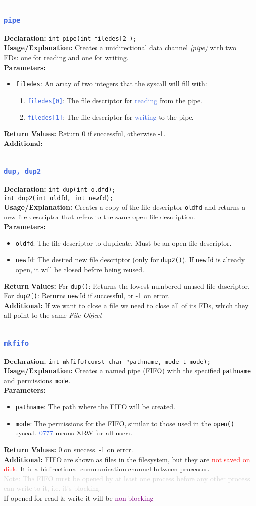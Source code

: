 \documentclass[openany,12pt]{book}
\newcommand{\code}[1]{\texttt{#1}}
\newcommand{\red}[1]{\textcolor{red}{#1}}
\newcommand{\blue}[1]{\textcolor{RoyalBlue}{#1}}
\newcommand{\gray}[1]{\textcolor{lightgray}{#1}}
\newcommand{\purple}[1]{\textcolor{Purple}{#1}}
\newcommand{\functionEntryPar}[6]{%
  \noindent\rule{\linewidth}{0.5pt}
  \subsubsection*{\blue{\large{\texttt{#1}}}}
  \textbf{Declaration:} \texttt{#2} \\
  \textbf{Usage/Explanation:} #3 \\
  \textbf{Parameters:}
  \begin{itemize}[leftmargin=*]
    #4
  \end{itemize}
  \textbf{Return Values:} #5 \\
  \textbf{Additional:} #6
  \vspace{1em}
}
\begin{document}
\functionEntryPar{pipe}
{int pipe(int filedes[2]);}
{Creates a unidirectional data channel \textit{(pipe)} with two FDs: one for reading and one for writing.}
{
  \item \code{filedes}: An array of two integers that the syscall will fill with:

  \begin{enumerate}[leftmargin=*]
    \item \blue{\code{filedes[0]}}: The file descriptor for \blue{reading} from the pipe.
    \item \blue{\code{filedes[1]}}: The file descriptor for \blue{writing} to the pipe.
  \end{enumerate}
}
{Return 0 if successful, otherwise -1.}
{\label{func:pipe}}



\functionEntryPar{dup, dup2}
{int dup(int oldfd);\\ int dup2(int oldfd, int newfd);}
{Creates a copy of the file descriptor \code{oldfd} and returns a new file descriptor that refers to the same open file description.}
{
  \item \code{oldfd}: The file descriptor to duplicate. Must be an open file descriptor.
  \item \code{newfd}: The desired new file descriptor (only for \code{dup2()}). If \code{newfd} is already open, it will be closed before being reused.
}
{
  For \code{dup()}: Returns the lowest numbered unused file descriptor.\\
  For \code{dup2()}: Returns \code{newfd} if successful, or -1 on error.
}
{If we want to close a file we need to close all of its FDs, which they all point to the same \textit{File Object}\label{func:dup}}


\functionEntryPar{mkfifo}
{int mkfifo(const char *pathname, mode\_t mode);}
{Creates a named pipe (FIFO) with the specified \code{pathname} and permissions \code{mode}.}
{
  \item \code{pathname}: The path where the FIFO will be created.
  \item \code{mode}: The permissions for the FIFO, similar to those used in the \code{open()} syscall. \blue{0777} means XRW for all users.
}
{0 on success, -1 on error.}
{FIFO are shown as files in the filesystem, but they are \red{not saved on disk}. It is a bidirectional communication channel between processes.\\
  \gray{Note: The FIFO must be opened by at least one process before any other process can write to it, i.e. it's blocking.}\\
  If opened for read \& write it will be \purple{non-blocking}\label{func:mkfifo}
}
\end{document}
